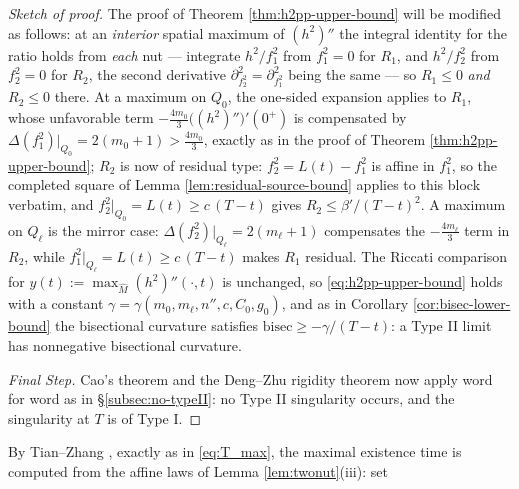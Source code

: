 \documentclass[11pt]{amsart}
\theoremstyle{plain}
\numberwithin{equation}{section}
\theoremstyle{definition}
\theoremstyle{remark}
\begin{document}
\begin{proof}[Sketch of proof]
The proof of Theorem \ref{thm:h2pp-upper-bound} will be modified as follows: at an \emph{interior} spatial maximum of $( h^2 )''$ the integral identity for the ratio holds from \emph{each} nut --- integrate $h^2 / f_1^2$ from $f_1^2 = 0$ for $R_1$, and $h^2 / f_2^2$ from $f_2^2 = 0$ for $R_2$, the second derivative $\partial_{f_2^2}^2 = \partial_{f_1^2}^2$ being the same --- so $R_1 \leq 0$ \emph{and} $R_2 \leq 0$ there. At a maximum on $Q_0$, the one-sided expansion applies to $R_1$, whose unfavorable term $- \tfrac{4 m_0}{3} \big( ( h^2 )'' \big)' ( 0^+ )$ is compensated by $\Delta ( f_1^2 ) \big|_{Q_0} = 2 ( m_0 + 1 ) > \tfrac{4 m_0}{3}$, exactly as in the proof of Theorem \ref{thm:h2pp-upper-bound}; $R_2$ is now of residual type: $f_2^2 = L (t) - f_1^2$ is affine in $f_1^2$, so the completed square of Lemma \ref{lem:residual-source-bound} applies to this block verbatim, and $f_2^2 \big|_{Q_0} = L (t) \geq c\, ( T - t )$ gives $R_2 \leq \beta' / ( T - t )^2$. A maximum on $Q_\ell$ is the mirror case: $\Delta (f_2^2)\big|_{Q_\ell} = 2 ( m_\ell + 1 )$ compensates the $-\tfrac{4 m_\ell}{3}$ term in $R_2$, while $f_1^2 \big|_{Q_\ell} = L (t) \geq c\, ( T - t )$ makes $R_1$ residual. The Riccati comparison for $y (t) := \max_{\widehat{M}} ( h^2 )'' ( \cdot, t )$ is unchanged, so \eqref{eq:h2pp-upper-bound} holds with a constant $\gamma = \gamma ( m_0, m_\ell, n'', c, C_0, g_0 )$, and as in Corollary \ref{cor:bisec-lower-bound} the bisectional curvature satisfies $\mathrm{bisec} \geq - \gamma / ( T - t )$: a Type II limit has nonnegative bisectional curvature.

\emph{Final Step.} Cao's theorem \cite{Cao97} and the Deng--Zhu rigidity theorem \cite{DZ20} now apply word for word as in \S\ref{subsec:no-typeII}: no Type II singularity occurs, and the singularity at $T$ is of Type I.
\end{proof}

By Tian--Zhang \cite{TZ}, exactly as in \eqref{eq:T_max}, the maximal existence time is computed from the affine laws of Lemma \ref{lem:twonut}(iii): set
\end{document}
